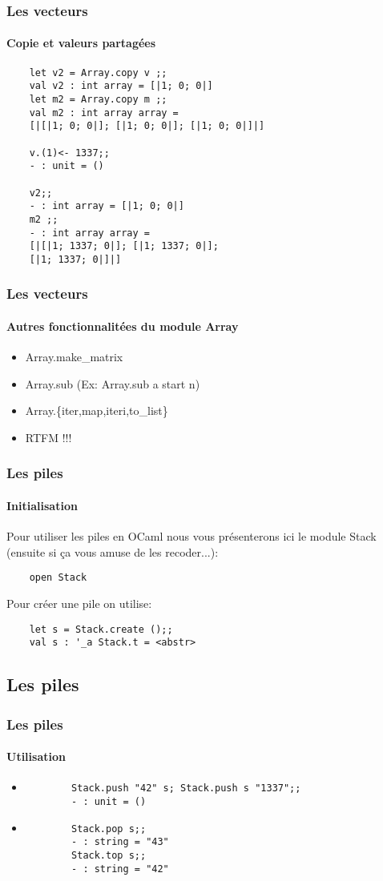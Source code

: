 \begin{frame}[fragile]
\frametitle{Les vecteurs}
\framesubtitle{Copie et valeurs partagées}
\begin{lstlisting}
	let v2 = Array.copy v ;;
	val v2 : int array = [|1; 0; 0|]
	let m2 = Array.copy m ;;
	val m2 : int array array = 
	[|[|1; 0; 0|]; [|1; 0; 0|]; [|1; 0; 0|]|]

	v.(1)<- 1337;;
	- : unit = ()

	v2;; 
	- : int array = [|1; 0; 0|]
	m2 ;;
	- : int array array = 
	[|[|1; 1337; 0|]; [|1; 1337; 0|]; 
	[|1; 1337; 0|]|]
\end{lstlisting}
\end{frame}

\begin{frame}[fragile]
\frametitle{Les vecteurs}
\framesubtitle{Autres fonctionnalitées du module Array}
\begin{itemize}
	\item Array.make\_matrix
	
	\item Array.sub (Ex: Array.sub a start n)
	
	\item Array.\{iter,map,iteri,to\_list\}

	\item RTFM !!!
\end{itemize}
\end{frame}

\begin{frame}[fragile]
\frametitle{Les piles}
\framesubtitle{Initialisation}
	Pour utiliser les piles en OCaml nous vous présenterons ici le module Stack (ensuite si ça vous amuse de les recoder...):
	\begin{lstlisting}
	open Stack
	\end{lstlisting}
	Pour créer une pile on utilise:
	\begin{lstlisting}
	let s = Stack.create ();;
	val s : '_a Stack.t = <abstr>
	\end{lstlisting}
\end{frame}

\subsection{Les piles}
\begin{frame}[fragile]
\frametitle{Les piles}
\framesubtitle{Utilisation}
	\begin{itemize}
	
	\item
		\begin{lstlisting}
		Stack.push "42" s; Stack.push s "1337";;
		- : unit = ()	
		\end{lstlisting}	
	
	\item
		\begin{lstlisting}
		Stack.pop s;;
		- : string = "43"
		Stack.top s;;
		- : string = "42"
		\end{lstlisting}	

	\end{itemize}

\end{frame}

